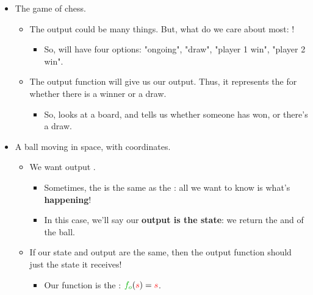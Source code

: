         \begin{itemize}
            \item The game of chess.
                \begin{itemize}
                    \item The output  could be many things. But, what do we care about most: ! 
                        \begin{itemize}
                            \item So,  will have four options: "ongoing", "draw", "player 1 win", "player 2 win".
                        \end{itemize}
                        
                    \item The output function  will give us our output. Thus, it represents the  for whether there is a winner or a draw.  
                        \begin{itemize}
                            \item So,  looks at a board, and tells us whether someone has won, or there's a draw.
                        \end{itemize}
                \end{itemize}
                
            \item A ball moving in space, with coordinates.
                \begin{itemize}
                    \item We want output .
                        \begin{itemize}
                            \item Sometimes, the  is the same as the : all we want to know is what's \textbf{happening}!
                            
                            \item In this case, we'll say our \textbf{output is the state}: we return the  and  of the ball.
                        \end{itemize}
                        
                    \item If our state and output are the same, then the output function  should just  the state it receives!
                        \begin{itemize}
                            \item Our function is the : $\grn{f_o}(\red{s}) = \red{s}$.
                        \end{itemize}
                \end{itemize}
                

\end{itemize}
